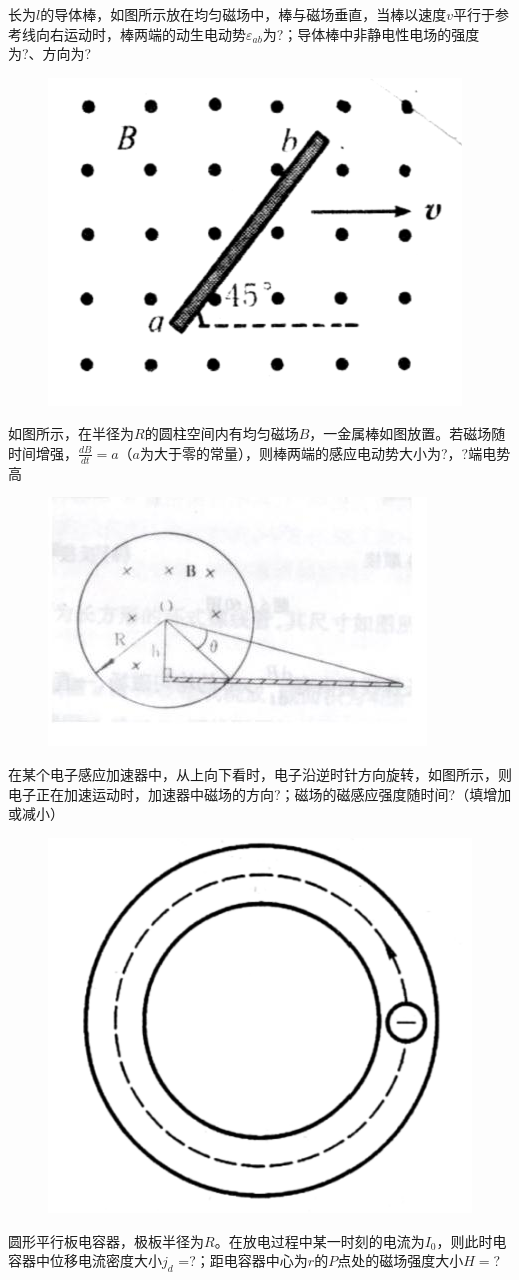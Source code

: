 \documentclass[lang=cn,10pt]{elegantbook}
\begin{document}
	 \begin{exercise}
	 	长为$l$的导体棒，如图所示放在均匀磁场中，棒与磁场垂直，当棒以速度$v$平行于参考线向右运动时，棒两端的动生电动势$\varepsilon_{ab}$为?；导体棒中非静电性电场的强度为?、方向为?
	 	
\begin{figure}[H]
	\centering
	\includegraphics[width=0.18\linewidth]{image/图片27}
	\caption{}
	\label{fig:27}
\end{figure}
	 	
	 \end{exercise}
	 \begin{exercise}
	 	如图所示，在半径为$R$的圆柱空间内有均匀磁场$B$，一金属棒如图放置。若磁场随时间增强，$\frac{dB}{dt}=a$（$a$为大于零的常量），则棒两端的感应电动势大小为?，?端电势高
	 	
\begin{figure}[H]
	\centering
	\includegraphics[width=0.18\linewidth]{image/图片28}
	\caption{}
	\label{fig:28}
\end{figure}
	 	
	 \end{exercise}
	 \begin{exercise}
	 	在某个电子感应加速器中，从上向下看时，电子沿逆时针方向旋转，如图所示，则电子正在加速运动时，加速器中磁场的方向?；磁场的磁感应强度随时间?（填增加或减小）
	 	
\begin{figure}[H]
	\centering
	\includegraphics[width=0.18\linewidth]{image/图片29}
	\caption{}
	\label{fig:29}
\end{figure}
	 	
	 \end{exercise}
	 \begin{exercise}
	 	圆形平行板电容器，极板半径为$R$。在放电过程中某一时刻的电流为$I_{0}$，则此时电容器中位移电流密度大小$j_{d}$ =?；距电容器中心为$r$的$P$点处的磁场强度大小$H =$?
	 \end{exercise}
\end{document}

